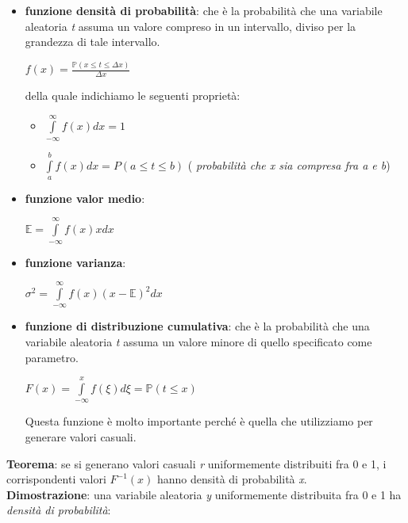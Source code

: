 \documentclass[11pt, oneside]{book}
\begin{document}
\begin{itemize}
\item {\bf funzione densit\`a di probabilit\`a}: che \`e la
  probabilit\`a che una variabile aleatoria {\em t} assuma un valore
  compreso in un intervallo, diviso per la grandezza di tale
  intervallo.

  \begin{center}
    $f(x) = \frac{\mathbb{P}(x \leq t \leq \Delta x) }{\Delta x}$
  \end{center}

  della quale indichiamo le seguenti propriet\`a:

  \begin{itemize}
  \item $\int\limits_{-\infty}^{\infty}f(x)dx = 1$
  \item $\int\limits_{a}^{b} f(x)dx = P(a \leq t \leq b)$ ({\em
    probabilit\`a che {\em x} sia compresa fra {\em a} e {\em b}})
  \end{itemize}

\item {\bf funzione valor medio}:

  \begin{center}
    $\mathbb{E} = \int\limits_{-\infty}^{\infty} f(x)x dx$
  \end{center}

\item {\bf funzione varianza}: 

  \begin{center}
    $\sigma^2 = \int\limits_{-\infty}^{\infty} f(x)(x-\mathbb{E})^2 dx$
  \end{center}

\item {\bf funzione di distribuzione cumulativa}: che \`e la
  probabilit\`a che una variabile aleatoria {\em t} assuma un valore
  minore di quello specificato come parametro.

  \begin{center}
    $F(x) = \int\limits_{-\infty}^x f(\xi)d\xi = \mathbb{P}(t \leq x)$
  \end{center}

  Questa funzione \`e molto importante perch\'e \`e quella che
  utilizziamo per generare valori casuali.

\end{itemize}

{\bf Teorema}: se si generano valori casuali {\em r} uniformemente
distribuiti fra 0 e 1, i corrispondenti valori $F^{-1}(x)$ hanno
densit\`a di probabilit\`a {\em x}.\\
{\bf Dimostrazione}: una variabile aleatoria {\em y} uniformemente
distribuita fra 0 e 1 ha {\em densit\`a di probabilit\`a}:
\end{document}
